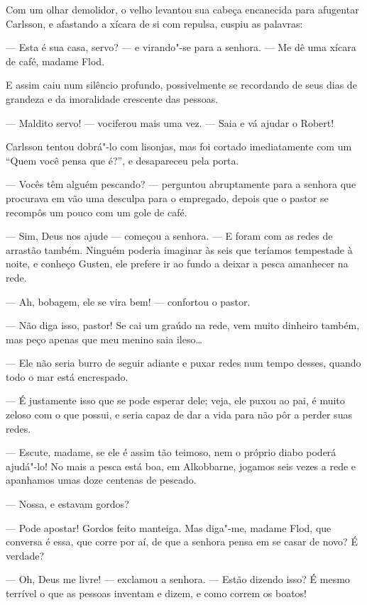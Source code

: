 Com um olhar demolidor, o velho levantou sua cabeça encanecida para afugentar
Carlsson, e afastando a xícara de si com repulsa, cuspiu as palavras:

--- Esta é sua casa, servo? --- e virando"-se para a senhora. --- Me dê uma xícara
de café, madame Flod.

E assim caiu num silêncio profundo, possivelmente se recordando de seus dias
de grandeza e da imoralidade crescente das pessoas.

--- Maldito servo! --- vociferou mais uma vez. --- Saia e vá ajudar o Robert!

Carlsson tentou dobrá"-lo com lisonjas, mas foi cortado imediatamente com
um ``Quem você pensa que é?'', e desapareceu pela porta.

--- Vocês têm alguém pescando? --- perguntou abruptamente para a senhora que
procurava em vão uma desculpa para o empregado, depois que o pastor se recompôs
um pouco com um gole de café.

--- Sim, Deus nos ajude --- começou a senhora. --- E foram com as redes de arrastão
também. Ninguém poderia imaginar às seis que teríamos tempestade à noite, e
conheço Gusten, ele prefere ir ao fundo a deixar a pesca amanhecer na rede.

--- Ah, bobagem, ele se vira bem! --- confortou o pastor.

--- Não diga isso, pastor! Se cai um graúdo na rede, vem muito dinheiro também,
mas peço apenas que meu menino saia ileso\ldots{}

--- Ele não seria burro de seguir adiante e puxar redes num tempo desses,
quando todo o mar está encrespado.

--- É justamente isso que se pode esperar dele; veja, ele puxou ao pai,  
é muito zeloso com o que possui, e seria capaz de dar a vida para não pôr a
perder suas redes.

--- Escute, madame, se ele é assim tão teimoso, nem o próprio diabo poderá ajudá"-lo!
No mais a pesca está boa, em Alkobbarne, jogamos seis vezes a rede e
apanhamos umas doze centenas de pescado.

--- Nossa, e estavam gordos?

--- Pode apostar! Gordos feito manteiga. Mas diga"-me, madame Flod, que conversa
é essa, que corre por aí, de que a senhora pensa em se casar de novo? É verdade?

--- Oh, Deus me livre! --- exclamou a senhora. --- Estão dizendo isso? É mesmo
terrível o que as pessoas inventam e dizem, e como correm os boatos!


